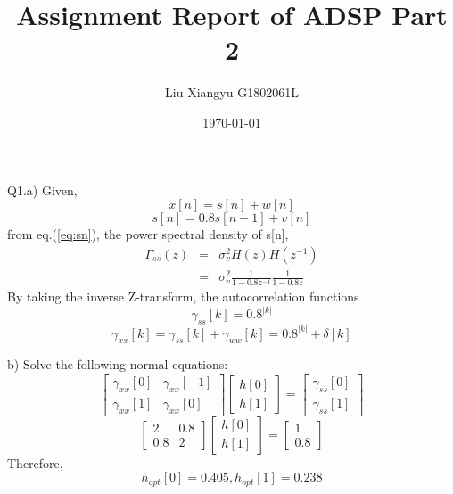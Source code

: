 \documentclass[12pt]{article}
\begin{document}
\title{Assignment Report of ADSP Part 2\\
	 }
\author{Liu Xiangyu G1802061L}
\date{\today}
\maketitle

\noindent
Q1.a)
Given,
\begin{equation}
	x[n]=s[n]+w[n]
	\label{eq:xn}
\end{equation}
\begin{equation}
	s[n]=0.8s[n-1]+v[n]
	\label{eq:sn}
\end{equation}
from eq.(\ref{eq:sn}), the power spectral density of s[n],
\begin{equation}
	\label{eq:psdsn}
	\begin{array}{lll}
		\Gamma_{ss}(z)&=&\sigma_{v}^{2}H(z)H(z^{-1})\\
		&=&\sigma_{v}^{2}\frac{1}{1-0.8z^{-1}}\frac{1}{1-0.8z}
	\end{array}
\end{equation}
By taking the inverse Z-transform, the autocorrelation functions
\begin{equation}
\label{eq:rss}
	\gamma_{ss}[k]=0.8^{|k|}
\end{equation}
\begin{equation}
\label{eq:rxx}
	\gamma_{xx}[k]=\gamma_{ss}[k]+\gamma_{ww}[k]=0.8^{|k|}+\delta[k]
\end{equation}

\noindent
b)
Solve the following normal equations:
\begin{equation}
	\left [
	\begin{array}{cc}
		\gamma_{xx}[0]&\gamma_{xx}[-1]\\
		\gamma_{xx}[1]&\gamma_{xx}[0]
	\end{array}
	\right ]
	\left[
	\begin{array}{c}
	h[0]\\
	h[1]
	\end{array}
	\right ]
	=\left[
	\begin{array}{c}
		\gamma_{ss}[0]\\
		\gamma_{ss}[1]
	\end{array}
	\right]
\end{equation}
\begin{equation}
	\left[
	\begin{array}{cc}
		2&0.8\\
		0.8&2
	\end{array}
	\right]
	\left[
	\begin{array}{c}
		h[0]\\
		h[1]
	\end{array}
	\right]
	=
	\left[
	\begin{array}{c}
		1\\
		0.8
	\end{array}
	\right]
\end{equation}
Therefore,
\begin{equation}
\label{eq:h}
	h_{opt}[0]=0.405, h_{opt}[1]=0.238
\end{equation}
\end{document}
